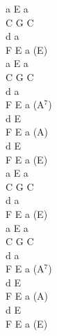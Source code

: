 \documentclass[a5paper, 10pt]{book}
\begin{document}
\begin{minipage}[t]{0.2\textwidth}
a E a\\
C G C\\
d a\\
F E a (E)\\
a E a\\
C G C\\
d a\\
F E a (A$^7$)\\

d E\\
F E a (A)\\
d E\\
F E a (E)\\

a E a\\
C G C\\
d a\\
F E a (E)\\
a E a\\
C G C\\
d a\\
F E a (A$^7$)\\

d E\\
F E a (A)\\
d E\\
F E a (E)\\
\end{minipage}

\newpage
\end{document}
